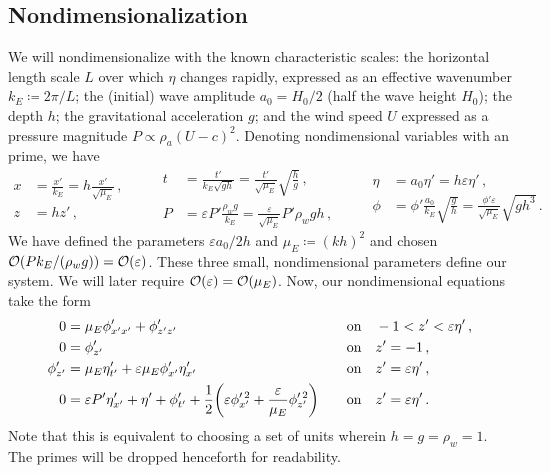 \documentclass{jfm}
\renewcommand*{\epsilon}{\varepsilon}
\begin{document}
\subsection{\label{sec:nondim} Nondimensionalization}
We will nondimensionalize with the known characteristic scales: the
horizontal length scale $L$ over which $\eta$ changes
rapidly, expressed as an effective wavenumber $k_E \coloneqq 2 \pi/L$;
the (initial) wave amplitude $a_0 = H_0/2$ (\ie half the wave height
$H_0$); the depth $h$; the gravitational acceleration $g$; and the wind
speed $U$ expressed as a pressure magnitude $P \propto \rho_a (U-c)^2$.
Denoting nondimensional variables with an prime, we have
\begin{equation*}
  \begin{aligned}
  x &= \frac{x'}{k_E} = h \frac{x'}{\sqrt{\mu_E}}\,, \\
  z &= h z' \,,
  \end{aligned}
  \qquad
  \begin{aligned}
  t &= \frac{t'}{k_E\sqrt{g h}}
    = \frac{t'}{\sqrt{\mu_E}} \sqrt{\frac{h}{g}} \,, \\
  P &= \epsilon P' \frac{\rho_w g}{k_E}
    = \frac{\epsilon}{\sqrt{\mu_E}} P' \rho_w g h \,,
  \end{aligned}
  \qquad
  \begin{aligned}
  \eta &= a_0 \eta' = h \epsilon \eta' \,, \\
  \phi &= \phi'\frac{a_0}{k_E}\sqrt{\frac{g}{h}}
    = \frac{\phi'\epsilon}{\sqrt{\mu_E}}\sqrt{g h^3} \,.
  \end{aligned}
\end{equation*}
We have defined the parameters $\epsilon a_0/2h$ and $\mu_E \coloneqq
(kh)^2$ and chosen $\order{P k_E/(\rho_w g)} = \order{\epsilon}$.
These three small, nondimensional parameters define our system.
We will later require $\order{\epsilon} = \order{\mu_E}$.
Now, our nondimensional equations take the form
\begin{alignat}{2}
  0 &= \mu_E \phi'_{x'x'} + \phi'_{z'z'} &&\qq{on}
    -1 < z' < \epsilon \eta' \,, \label{eq:laplace_nondim} \\
  0 &= \phi'_{z'} &&\qq{on} z'=-1 \,, \label{eq:bottom_bc_nondim} \\
  \phi'_{z'} &= \mu_E \eta'_{t'} +
    \epsilon \mu_E \phi'_{x'} \eta'_{x'} &&\qq{on} z' = \epsilon \eta' \,,
    \label{eq:kinematic_bc_nondim} \\
  0 &= \epsilon P' \eta'_{x'} +  \eta' + \phi'_{t'} + \frac{1}{2}
    \pqty{\epsilon \phi_{x'}^{\prime \, 2} + \frac{\epsilon}{\mu_E}
    \phi_{z'}^{\prime \, 2}} &&\qq{on} z'= \epsilon \eta' \,.
    \label{eq:dynamic_bc_nondim}
\end{alignat}
Note that this is equivalent to choosing a set of units wherein $h = g =
\rho_w = 1$.
The primes will be dropped henceforth for readability.
\end{document}
